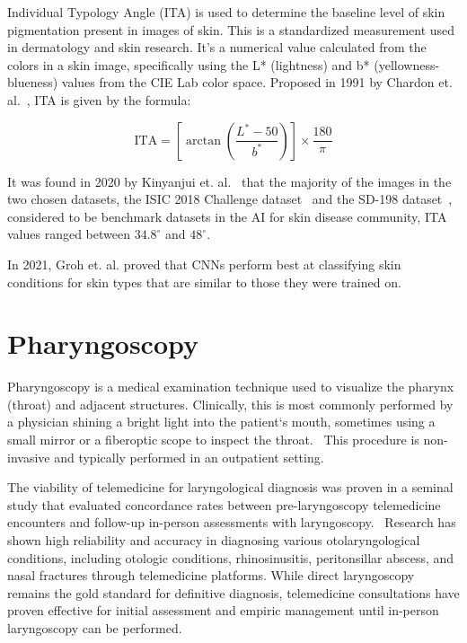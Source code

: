 Individual Typology Angle (ITA) is used to determine the baseline level of skin pigmentation present in images of skin. This is a standardized measurement used in dermatology and skin research. It's a numerical value calculated from the colors in a skin image, specifically using the L* (lightness) and b* (yellowness-blueness) values from the CIE Lab color space. Proposed in 1991 by Chardon et. al.~\cite{chardon}, ITA is given by the formula: \par

\begin{equation}
    \text{ITA} = \left[\arctan\left(\frac{L^* - 50}{b^*}\right)\right] \times \frac{180}{\pi}
\end{equation}

It was found in 2020 by Kinyanjui et. al.~\cite{kinnie} that the majority of the images in the two chosen datasets, the ISIC 2018 Challenge dataset~\cite{isic2018} and the SD-198 dataset~\cite{sun}, considered to be benchmark datasets in the AI for skin disease community, ITA values ranged between $34.8^\circ$ and $48^\circ$. \par

In 2021, Groh et. al. proved that CNNs perform best at classifying skin conditions for skin types that are similar to those they were trained on. ~\cite{groh}

\section{Pharyngoscopy}

Pharyngoscopy is a medical examination technique used to visualize the pharynx (throat) and adjacent structures. Clinically, this is most commonly performed by a physician shining a bright light into the patient`s mouth, sometimes using a small mirror or a fiberoptic scope to inspect the throat.~\cite{onto} This procedure is non-invasive and typically performed in an outpatient setting. \par

The viability of telemedicine for laryngological diagnosis was proven in a seminal study that evaluated concordance rates between pre-laryngoscopy telemedicine encounters and follow-up in-person assessments with laryngoscopy.~\cite{choi} Research has shown high reliability and accuracy in diagnosing various otolaryngological conditions, including otologic conditions, rhinosinusitis, peritonsillar abscess, and nasal fractures through telemedicine platforms. While direct laryngoscopy remains the gold standard for definitive diagnosis, telemedicine consultations have proven effective for initial assessment and empiric management until in-person laryngoscopy can be performed. \par

